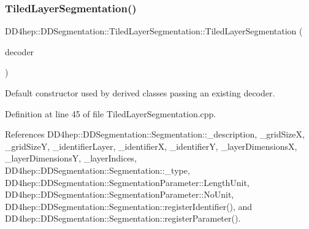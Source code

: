 \hypertarget{class_d_d4hep_1_1_d_d_segmentation_1_1_tiled_layer_segmentation_ade81bfe57661f1faf98877b6e4de725e}{}\label{class_d_d4hep_1_1_d_d_segmentation_1_1_tiled_layer_segmentation_ade81bfe57661f1faf98877b6e4de725e} 
\subsubsection{\texorpdfstring{Tiled\+Layer\+Segmentation()}{TiledLayerSegmentation()}\hspace{0.1cm}{\footnotesize\ttfamily [2/2]}}
{\footnotesize\ttfamily D\+D4hep\+::\+D\+D\+Segmentation\+::\+Tiled\+Layer\+Segmentation\+::\+Tiled\+Layer\+Segmentation (\begin{DoxyParamCaption}\item[{\hyperlink{class_d_d4hep_1_1_d_d_segmentation_1_1_bit_field64}{Bit\+Field64} $\ast$}]{decoder }\end{DoxyParamCaption})}



Default constructor used by derived classes passing an existing decoder. 



Definition at line 45 of file Tiled\+Layer\+Segmentation.\+cpp.



References D\+D4hep\+::\+D\+D\+Segmentation\+::\+Segmentation\+::\+\_\+description, \+\_\+grid\+SizeX, \+\_\+grid\+SizeY, \+\_\+identifier\+Layer, \+\_\+identifierX, \+\_\+identifierY, \+\_\+layer\+DimensionsX, \+\_\+layer\+DimensionsY, \+\_\+layer\+Indices, D\+D4hep\+::\+D\+D\+Segmentation\+::\+Segmentation\+::\+\_\+type, D\+D4hep\+::\+D\+D\+Segmentation\+::\+Segmentation\+Parameter\+::\+Length\+Unit, D\+D4hep\+::\+D\+D\+Segmentation\+::\+Segmentation\+Parameter\+::\+No\+Unit, D\+D4hep\+::\+D\+D\+Segmentation\+::\+Segmentation\+::register\+Identifier(), and D\+D4hep\+::\+D\+D\+Segmentation\+::\+Segmentation\+::register\+Parameter().

\hypertarget{class_d_d4hep_1_1_d_d_segmentation_1_1_tiled_layer_segmentation_ac4a4730758ab96a1215fb55999503af2}{}\label{class_d_d4hep_1_1_d_d_segmentation_1_1_tiled_layer_segmentation_ac4a4730758ab96a1215fb55999503af2} 

